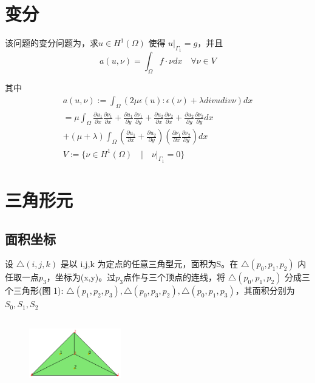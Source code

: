 \documentclass[UTF8,titlepage,twocolumn]{ctexart}
\begin{document}
\section{变分}

该问题的变分问题为，求$u \in H^1(\Omega)$ 使得 $u |_{\Gamma_1} = g$，并且
$$
	a(u,\nu) = \int_{\Omega} f \cdot \nu dx \quad \forall \nu \in V
$$ 
\par
其中
$$
	\begin{matrix}
		a(u,\nu) := \int_{\Omega} (2 \mu \epsilon(u) : \epsilon(\nu) + \lambda div u div \nu) dx \\
		= \mu \int_{\Omega} \frac{\partial u_1}{\partial x} \frac{\partial \nu_1}{\partial x} + \frac{\partial u_1}{\partial y} \frac{\partial \nu_1}{\partial y} + \frac{\partial u_2}{\partial x} \frac{\partial \nu_2}{\partial x} + \frac{\partial u_2}{\partial y} \frac{\partial \nu_2}{\partial y} dx
		\\  
		+ (\mu + \lambda) \int_{\Omega} (\frac{\partial u_1}{\partial x} + \frac{\partial u_2}{\partial y}) (\frac{\partial \nu_1}{\partial x} \frac{\partial \nu_2}{\partial y}) dx
		\\
		V := \{ \nu \in H^1(\Omega) \quad | \quad \nu |_{\Gamma_1} = 0 \}
	\end{matrix}
$$

\section{三角形元}

\subsection{面积坐标}

设 $ \bigtriangleup(i,j,k) $ 是以 i,j,k 为定点的任意三角型元，面积为S。在 $ \bigtriangleup (p_0,p_1,p_2) $ 内任取一点$p_3$，坐标为(x,y)。过$p_3$点作与三个顶点的连线，将 $ \bigtriangleup(p_0,p_1,p_2) $ 分成三个三角形(图 1): $ \bigtriangleup(p_1,p_2,p_3), \bigtriangleup(p_0,p_3,p_2), \bigtriangleup(p_0,p_1,p_3) $，其面积分别为$S_0,S_1,S_2$

\begin{figure}[hb]
	\centering
	\includegraphics[height=3cm,width=4cm]{../image/TriangleElement.png}
	\caption{}
	\label{SampleOfDatasets}
\end{figure}
\end{document}
